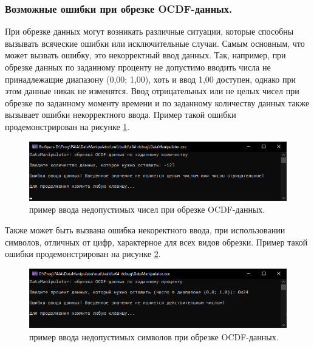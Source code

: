 \subsubsection{ \standartTitleFont
  Возможные ошибки при обрезке OCDF-данных. 
} \label{subsubsec:OCDFCutErr}

{\standartFont

  \par При обрезке данных могут возникать различные ситуации, которые способны вызывать всяческие ошибки или исключительные случаи. Самым основным, что может вызвать ошибку, это некорректный ввод данных. Так, например, при обрезке данных по заданному проценту не допустимо вводить числа не принадлежащие диапазону (0,00; 1,00), хоть и ввод 1,00 доступен, однако при этом данные никак не изменятся. Ввод отрицательных или не целых чисел при обрезке по заданному моменту времени и по заданному количеству данных также вызывает ошибки некорректного ввода. Пример такой ошибки продемонстрирован на рисунке \ref{fig:ExOCDFdataCatErr1}.

  \begin{figure}[H]
    \centering
    \includegraphics[width=\textwidth]{images/forDataManipulator/ExOCDFdataCatError1.png}
    \caption{пример ввода недопустимых чисел при обрезке OCDF-данных.} 
    \label{fig:ExOCDFdataCatErr1}
  \end{figure}

  \par Также может быть вызвана ошибка некоректного ввода, при использовании символов, отличных от цифр, характерное для всех видов обрезки. Пример такой ошибки продемонстрирован на рисунке \ref{fig:ExOCDFdataCatErr2}.

  \begin{figure}[H]
    \centering
    \includegraphics[width=\textwidth]{images/forDataManipulator/ExOCDFdataCatError2.png}
    \caption{пример ввода недопустимых символов при обрезке OCDF-данных.} 
    \label{fig:ExOCDFdataCatErr2}
  \end{figure}

}
